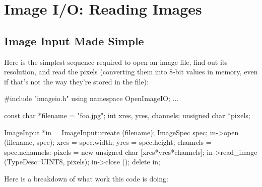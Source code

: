 \chapter{Image I/O: Reading Images}
\label{chap:imageinput}


\section{Image Input Made Simple}
\label{sec:imageinput:simple}

Here is the simplest sequence required to open an image file, find
out its resolution, and read the pixels (converting them into
8-bit values in memory, even if that's not the way they're stored in the file):

\begin{code}
        #include "imageio.h"
        using namespace OpenImageIO;
        ...

        const char *filename = "foo.jpg";
        int xres, yres, channels;
        unsigned char *pixels;

        ImageInput *in = ImageInput::create (filename);
        ImageSpec spec;
        in->open (filename, spec);
        xres = spec.width;
        yres = spec.height;
        channels = spec.nchannels;
        pixels = new unsigned char [xres*yres*channels];
        in->read_image (TypeDesc::UINT8, pixels);
        in->close ();
        delete in;
\end{code}

\noindent Here is a breakdown of what work this code is doing:

